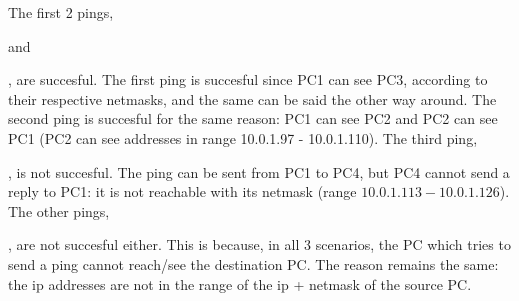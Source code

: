 The first 2 pings, \newline

 and \newline

, are succesful. The first ping is succesful since PC1 can see PC3, according to their respective netmasks, and the same can be said the other way around. \newline
The second ping is succesful for the same reason: PC1 can see PC2 and PC2 can see PC1 (PC2 can see addresses in range 10.0.1.97 - 10.0.1.110). \newline
\newline
The third ping, \newline

, is not succesful. The ping can be sent from PC1 to PC4, but PC4 cannot send a reply to PC1: it is not reachable with its netmask (range $10.0.1.113 - 10.0.1.126$). \newline
\newline
The other pings, \newline



, are not succesful either. This is because, in all 3 scenarios, the PC which tries to send a ping cannot reach/see the destination PC. The reason remains the same: the ip addresses are not in the range of the ip + netmask of the source PC.